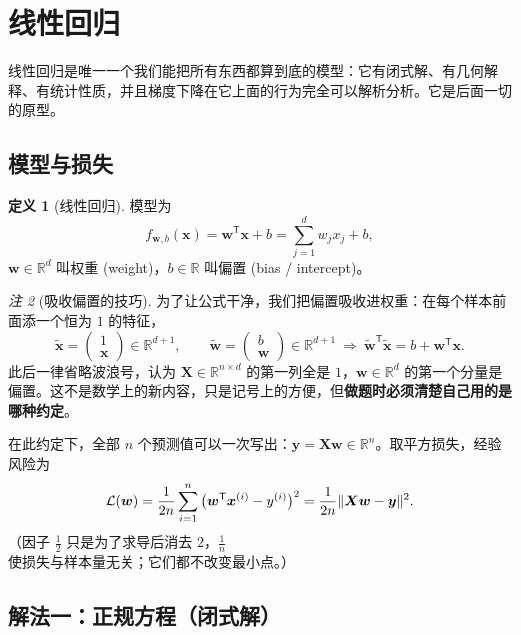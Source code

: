\documentclass[UTF8,a4paper,11pt]{ctexart}
\theoremstyle{definition}
\newtheorem{definition}{定义}[section]
\theoremstyle{plain}
\theoremstyle{remark}
\newtheorem{remark}[definition]{注}
\DeclarePairedDelimiter{\norm}{\lVert}{\rVert}
\newcommand{\R}{\mathbb{R}}
\newcommand{\Loss}{\mathcal{L}}
\newcommand{\T}{^{\mathsf{T}}}
\newcommand{\eng}[1]{\textup{(#1)}}
\begin{document}
\section{线性回归}\label{sec:linreg}

线性回归是唯一一个我们能把所有东西都算到底的模型：它有闭式解、有几何解释、有统计性质，并且梯度下降在它上面的行为完全可以解析分析。它是后面一切的原型。

\subsection{模型与损失}

\begin{definition}[线性回归]\label{def:linreg}
模型为
\[
  f_{\bm{w},b}(\bm{x})=\bm{w}\T\bm{x}+b=\sum_{j=1}^{d}w_jx_j+b ,
\]
$\bm{w}\in\R^d$ 叫权重 \eng{weight}，$b\in\R$ 叫偏置 \eng{bias / intercept}。
\end{definition}

\begin{remark}[吸收偏置的技巧]\label{rmk:absorb-bias}
为了让公式干净，我们把偏置吸收进权重：在每个样本前面添一个恒为 $1$ 的特征，
\[
  \tilde{\bm{x}}=\begin{pmatrix}1\\ \bm{x}\end{pmatrix}\in\R^{d+1},\qquad
  \tilde{\bm{w}}=\begin{pmatrix}b\\ \bm{w}\end{pmatrix}\in\R^{d+1}
  \ \Longrightarrow\ \tilde{\bm{w}}\T\tilde{\bm{x}}=b+\bm{w}\T\bm{x}.
\]
此后一律省略波浪号，认为 $\bm{X}\in\R^{n\times d}$ 的第一列全是 $1$，$\bm{w}\in\R^d$ 的第一个分量是偏置。这不是数学上的新内容，只是记号上的方便，但\textbf{做题时必须清楚自己用的是哪种约定}。
\end{remark}

在此约定下，全部 $n$ 个预测值可以一次写出：$\hat{\bm{y}}=\bm{X}\bm{w}\in\R^n$。取平方损失，经验风险为
\begin{equation}\label{eq:linreg-loss}
  \Loss(\bm{w})=\frac{1}{2n}\sum_{i=1}^{n}\big(\bm{w}\T\bm{x}^{(i)}-y^{(i)}\big)^2
  =\frac{1}{2n}\norm{\bm{X}\bm{w}-\bm{y}}^2 .
\end{equation}
（因子 $\tfrac12$ 只是为了求导后消去 $2$，$\tfrac1n$ 使损失与样本量无关；它们都不改变最小点。）

\subsection{解法一：正规方程（闭式解）}
\end{document}
